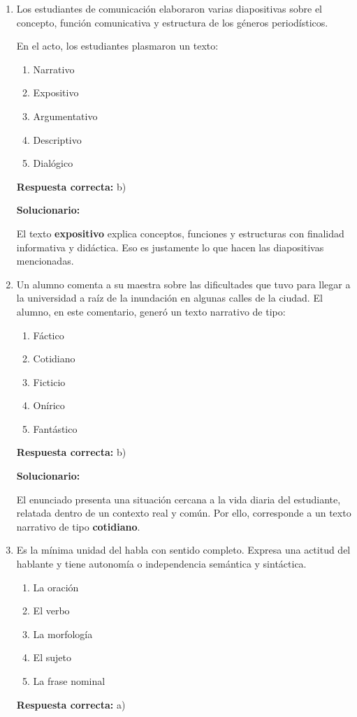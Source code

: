 \begin{enumerate}[resume]
	
	
	\item Los estudiantes de comunicación elaboraron varias diapositivas sobre el concepto, función comunicativa y estructura de los géneros periodísticos.
	
	En el acto, los estudiantes plasmaron un texto:
	\begin{enumerate}[label=\alph*)]
		\item Narrativo
		\item Expositivo
		\item Argumentativo
		\item Descriptivo
		\item Dialógico
	\end{enumerate}
	\textbf{Respuesta correcta:} b)
	
	\vspace{2mm}
	\textbf{Solucionario:}
	
	El texto \textbf{expositivo} explica conceptos, funciones y estructuras con finalidad informativa y didáctica.  
	Eso es justamente lo que hacen las diapositivas mencionadas.
	
	\vspace{6mm}
	
	\item Un alumno comenta a su maestra sobre las dificultades que tuvo para llegar a la universidad a raíz de la inundación en algunas calles de la ciudad. El alumno, en este comentario, generó un texto narrativo de tipo:
	\begin{enumerate}[label=\alph*)]
		\item Fáctico
		\item Cotidiano
		\item Ficticio
		\item Onírico
		\item Fantástico
	\end{enumerate}
	\textbf{Respuesta correcta:} b)
	
	\vspace{2mm}
	\textbf{Solucionario:}
	
	El enunciado presenta una situación cercana a la vida diaria del estudiante, relatada dentro de un contexto real y común. Por ello, corresponde a un texto narrativo de tipo \textbf{cotidiano}.
	
	\vspace{6mm}
	
	
	\item Es la mínima unidad del habla con sentido completo. Expresa una actitud del hablante y tiene autonomía o independencia semántica y sintáctica.
	\begin{enumerate}[label=\alph*)]
		\item La oración
		\item El verbo
		\item La morfología
		\item El sujeto
		\item La frase nominal
	\end{enumerate}
	\textbf{Respuesta correcta:} a)
	

\end{enumerate}
